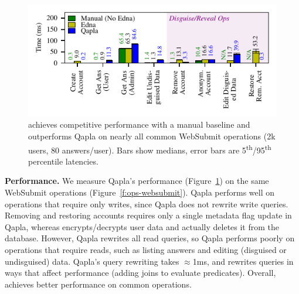 %
\begin{figure}[t]
  \centering
      \includegraphics[width=\columnwidth]{figs/websubmit_qapla_op_stats}
    \caption{\sys achieves competitive performance with a manual baseline and
    outperforms Qapla on nearly all common WebSubmit operations (2k users,
    80 answers/user).
    Bars show medians, error bars are 5\textsuperscript{th}/95\textsuperscript{th}
    percentile latencies.}
  \label{f:qapla_ws_opstats}
\end{figure}

%
\textbf{Performance.}
%
We measure Qapla's performance (Figure~\ref{f:qapla_ws_opstats}) on the same
WebSubmit operations (Figure~\ref{f:ops-websubmit}).
%
Qapla performs well on operations that require only writes, since Qapla does not
rewrite write queries.  Removing and restoring accounts requires only a single
metadata flag update in Qapla, whereas \sys encrypts/decrypts user data and
actually deletes it from the database.
%
However, Qapla rewrites all read queries, so Qapla performs poorly on operations
that require reads, such as listing answers and editing (disguised or
undisguised) data.
%
Qapla's query rewriting takes $\approx$1ms, and rewrites  queries in
ways that affect performance (\eg adding joins to evaluate predicates).
%
Overall, \sys achieves better performance on common operations.

%
